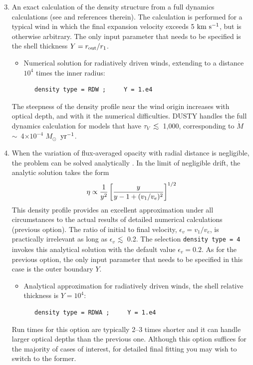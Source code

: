 \documentclass[11pt]{article}
\def\E#1{\hbox{$10^{#1}$}}
\def\eq#1{\begin{equation} #1 \end{equation}}
\def\about  {\hbox{$\sim$}}
\def\laa    {\mathrel{\hbox{\raise.3ex\hbox{$<$}\llap
                                {\lower.8ex\hbox{$\sim$}}}}}
\def\la     {\hbox{$\laa$}}
\def\x      {\hbox{$\times$}}
\def\tV     {\hbox{$\tau_V$}}
\def\Mo     {\hbox{$M_{\odot}$}}
\def\Mdot   {\hbox{$\dot{M}$}}
\def\kms    {\hbox{$\rm km\ s^{-1}$}}
\begin{document}
\begin{enumerate}
\setcounter{enumi}{2}
\item An exact calculation of the density structure from a full dynamics
    calculations (see \cite{IE95} and references therein).  The calculation
    is performed for a typical wind in which the final expansion velocity
    exceeds 5 \kms, but is otherwise arbitrary. The only input parameter
    that needs to be specified is the shell thickness $Y = r_{\rm
    out}/r_1$.

\begin{itemize}
\item Numerical solution for radiatively driven winds, extending to a
    distance $10^4$ times the inner radius:

\begin{verbatim}
   density type = RDW ;     Y = 1.e4
\end{verbatim}
\end{itemize}
The steepness of the density profile near the wind origin increases with
optical depth, and with it the numerical difficulties.  DUSTY handles the
full dynamics calculation for models that have \tV\ \la\ 1,000,
corresponding to \Mdot\ \about\ 4\x\E{-4} \Mo\ $\rm yr^{-1}$.

\item When the variation of flux-averaged opacity with radial distance is
    negligible, the problem can be solved analytically \cite{IEprep}.  In
    the limit of negligible drift, the analytic solution takes the form
\eq{
    \eta \propto {1\over y^2}\left[{y \over y - 1 +
    (v_1/v_e)^2}\right]^{1/2}
}
This density profile provides an excellent approximation under all
circumstances to the actual results of detailed numerical calculations
(previous option). The ratio of initial to final velocity, $\epsilon_v =
v_1/v_e$, is practically irrelevant as long as $\epsilon_v$ \la\ 0.2. The
selection {\tt density type = 4} invokes this analytical solution with the
default value $\epsilon_v = 0.2$. As for the previous option, the only
input parameter that needs to be specified in this case is the outer
boundary $Y$.

\begin{itemize}
\item Analytical approximation for radiatively driven winds, the shell
    relative thickness is $Y = 10^4$:

\begin{verbatim}
   density type = RDWA ;     Y = 1.e4
\end{verbatim}
\end{itemize}
Run times for this option are typically 2--3 times shorter and it can
handle larger optical depths than the previous one. Although this option
suffices for the majority of cases of interest, for detailed final fitting
you may wish to switch to the former.

\end{enumerate}
\end{document}
